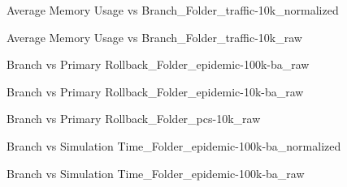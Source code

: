 \vspace{1cm}
\newpage
\begin{figure}[H]
\centering

\caption{Average Memory Usage vs Branch\_Folder\_traffic-10k\_normalized}
\end{figure}
\vspace{1cm}
\begin{figure}[H]
\centering

\caption{Average Memory Usage vs Branch\_Folder\_traffic-10k\_raw}
\end{figure}
\vspace{1cm}
\newpage
\begin{figure}[H]
\centering

\caption{Branch vs Primary Rollback\_Folder\_epidemic-100k-ba\_raw}
\end{figure}
\vspace{1cm}
\begin{figure}[H]
\centering

\caption{Branch vs Primary Rollback\_Folder\_epidemic-10k-ba\_raw}
\end{figure}
\vspace{1cm}
\newpage
\begin{figure}[H]
\centering

\caption{Branch vs Primary Rollback\_Folder\_pcs-10k\_raw}
\end{figure}
\vspace{1cm}
\begin{figure}[H]
\centering

\caption{Branch vs Simulation Time\_Folder\_epidemic-100k-ba\_normalized}
\end{figure}
\vspace{1cm}
\newpage
\begin{figure}[H]
\centering

\caption{Branch vs Simulation Time\_Folder\_epidemic-100k-ba\_raw}
\end{figure}
